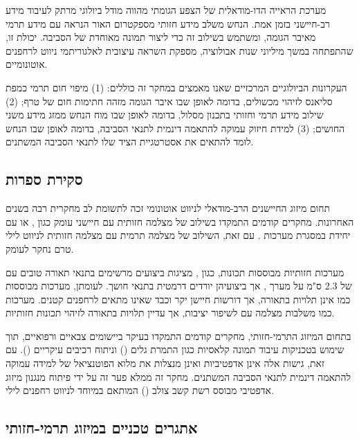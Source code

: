 מערכת הראייה הדו-מודאלית של הצפע הגומתי מהווה מודל ביולוגי מרתק לעיבוד מידע רב-חיישני בזמן אמת. הנחש משלב מידע חזותי מספקטרום האור הנראה עם מידע תרמי מאיבר הגומה, ומשתמש בשילוב זה כדי ליצור תמונה מאוחדת של הסביבה. יכולת זו, שהתפתחה במשך מיליוני שנות אבולוציה, מספקת השראה עיצובית לאלגוריתמי ניווט לרחפנים אוטונומיים.

העקרונות הביולוגיים המרכזיים שאנו מאמצים במחקר זה כוללים: (1) מיפוי חום תרמי כמפת סליאנס לזיהוי מכשולים, בדומה לאופן שבו איבר הגומה מזהה חתימות חום של טרף; (2) שילוב מידע תרמי וחזותי בתכנון מסלול, בדומה לאופן שבו מוח הנחש ממזג מידע משני החושים; (3) למידת חיזוק עמוקה להתאמה דינמית לתנאי הסביבה, בדומה לאופן שבו הנחש לומד להתאים את אסטרטגיית הציד שלו לתנאי הסביבה המשתנים.

\subsection{סקירת ספרות}
\label{sec:ch01_literature}

תחום מיזוג החיישנים הרב-מודאלי לניווט אוטונומי זכה לתשומת לב מחקרית רבה בשנים האחרונות. מחקרים קודמים התמקדו בשילוב של מצלמה חזותית עם חיישני עומק כגון  \cite{Zhang2014LOAM}, או עם יחידת  במסגרת מערכות  \cite{Kalman1960}. עם זאת, השילוב של מצלמה תרמית עם מצלמה חזותית לניווט לילי טרם נחקר לעומק.

מערכות  חזותיות מבוססות תכונות, כגון , מציגות ביצועים מרשימים בתנאי תאורה טובים עם  של 2.3 ס"מ על מערך , אך ביצועיהן יורדים דרמטית בתנאי חושך. לעומתן, מערכות מבוססות  כמו  \cite{Zhang2014LOAM} אינן תלויות בתאורה, אך דורשות חיישן יקר וכבד שאינו מתאים לרחפנים קטנים. מערכות  כמו  \cite{Kalman1960} משלבות מצלמה עם  לשיפור יציבות, אך עדיין תלויות בתאורה לזיהוי תכונות חזותיות.

בתחום המיזוג התרמי-חזותי, מחקרים קודמים התמקדו בעיקר ביישומים צבאיים ורפואיים, תוך שימוש בטכניקות עיבוד תמונה קלאסיות כגון התמרת גלים () וניתוח רכיבים עיקריים (). עם זאת, גישות אלה אינן אדפטיביות ואינן מנצלות את מלוא הפוטנציאל של למידה עמוקה להתאמה דינמית לתנאי הסביבה המשתנים. מחקר זה ממלא פער זה על ידי פיתוח מנגנון מיזוג אדפטיבי מבוסס רשת קשב צולב () המותאם במיוחד לניווט רחפנים לילי.

\subsection{אתגרים טכניים במיזוג תרמי-חזותי}
\label{sec:ch01_technical_challenges}

